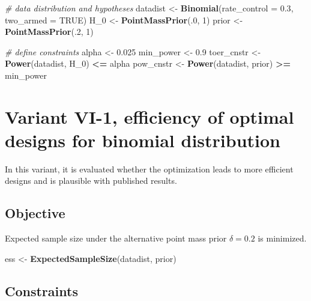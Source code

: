 \documentclass[
]{book}
\newenvironment{Shaded}{\begin{snugshade}}{\end{snugshade}}
\newcommand{\CommentTok}[1]{\textcolor[rgb]{0.56,0.35,0.01}{\textit{#1}}}
\newcommand{\DataTypeTok}[1]{\textcolor[rgb]{0.13,0.29,0.53}{#1}}
\newcommand{\DecValTok}[1]{\textcolor[rgb]{0.00,0.00,0.81}{#1}}
\newcommand{\FloatTok}[1]{\textcolor[rgb]{0.00,0.00,0.81}{#1}}
\newcommand{\KeywordTok}[1]{\textcolor[rgb]{0.13,0.29,0.53}{\textbf{#1}}}
\newcommand{\NormalTok}[1]{#1}
\newcommand{\OperatorTok}[1]{\textcolor[rgb]{0.81,0.36,0.00}{\textbf{#1}}}
\newcommand{\OtherTok}[1]{\textcolor[rgb]{0.56,0.35,0.01}{#1}}
\newcommand{\StringTok}[1]{\textcolor[rgb]{0.31,0.60,0.02}{#1}}
\begin{document}
\begin{Shaded}
\begin{Highlighting}[]
\CommentTok{# data distribution and hypotheses}
\NormalTok{datadist   <-}\StringTok{ }\KeywordTok{Binomial}\NormalTok{(}\DataTypeTok{rate_control =} \FloatTok{0.3}\NormalTok{, }\DataTypeTok{two_armed =} \OtherTok{TRUE}\NormalTok{)}
\NormalTok{H_}\DecValTok{0}\NormalTok{        <-}\StringTok{ }\KeywordTok{PointMassPrior}\NormalTok{(.}\DecValTok{0}\NormalTok{, }\DecValTok{1}\NormalTok{)}
\NormalTok{prior      <-}\StringTok{ }\KeywordTok{PointMassPrior}\NormalTok{(.}\DecValTok{2}\NormalTok{, }\DecValTok{1}\NormalTok{)}

\CommentTok{# define constraints}
\NormalTok{alpha      <-}\StringTok{ }\FloatTok{0.025}
\NormalTok{min_power  <-}\StringTok{ }\FloatTok{0.9}
\NormalTok{toer_cnstr <-}\StringTok{ }\KeywordTok{Power}\NormalTok{(datadist, H_}\DecValTok{0}\NormalTok{)   }\OperatorTok{<=}\StringTok{ }\NormalTok{alpha}
\NormalTok{pow_cnstr  <-}\StringTok{ }\KeywordTok{Power}\NormalTok{(datadist, prior) }\OperatorTok{>=}\StringTok{ }\NormalTok{min_power}
\end{Highlighting}
\end{Shaded}

\hypertarget{variantVI_1}{%
\section{Variant VI-1, efficiency of optimal designs for binomial distribution}\label{variantVI_1}}

In this variant, it is evaluated whether the optimization leads to more
efficient designs and is plausible with published results.

\hypertarget{objective-14}{%
\subsection{Objective}\label{objective-14}}

Expected sample size under the alternative point mass prior \(\delta = 0.2\)
is minimized.

\begin{Shaded}
\begin{Highlighting}[]
\NormalTok{ess <-}\StringTok{ }\KeywordTok{ExpectedSampleSize}\NormalTok{(datadist, prior)}
\end{Highlighting}
\end{Shaded}

\hypertarget{constraints-14}{%
\subsection{Constraints}\label{constraints-14}}
\end{document}
